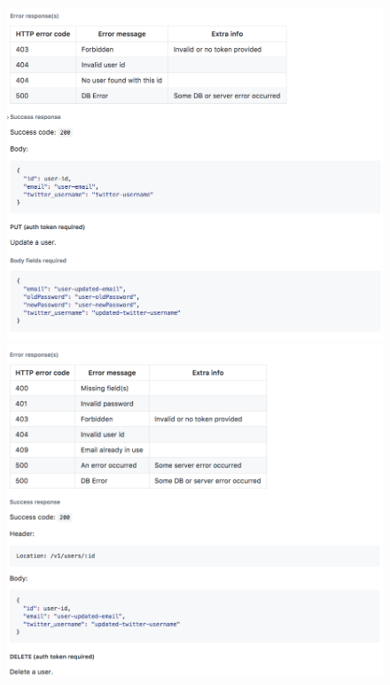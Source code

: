 \documentclass[11pt,openright,a4paper]{report}
\begin{document}
\begin{appendices}
\begin{figure}[ht]
  \centering
  \includegraphics[width=.9\textwidth]{i/apidocs7.png}
  \includegraphics[width=.9\textwidth]{i/apidocs8.png}
\end{figure}


\end{appendices}
\end{document}
